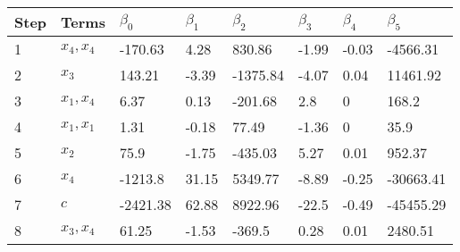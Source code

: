 \begin{tabular}{llllllll}
Step & Terms & $\beta_{0}$ & $\beta_{1}$ & $\beta_{2}$ & $\beta_{3}$ & $\beta_{4}$ & $\beta_{5}$ \\ 
\hline 
1 & $x_4,x_4$ & -170.63 & 4.28 & 830.86 & -1.99 & -0.03 & -4566.31 \\ 
2 & $x_3$ & 143.21 & -3.39 & -1375.84 & -4.07 & 0.04 & 11461.92 \\ 
3 & $x_1,x_4$ & 6.37 & 0.13 & -201.68 & 2.8 & 0 & 168.2 \\ 
4 & $x_1,x_1$ & 1.31 & -0.18 & 77.49 & -1.36 & 0 & 35.9 \\ 
5 & $x_2$ & 75.9 & -1.75 & -435.03 & 5.27 & 0.01 & 952.37 \\ 
6 & $x_4$ & -1213.8 & 31.15 & 5349.77 & -8.89 & -0.25 & -30663.41 \\ 
7 & $c$ & -2421.38 & 62.88 & 8922.96 & -22.5 & -0.49 & -45455.29 \\ 
8 & $x_3,x_4$ & 61.25 & -1.53 & -369.5 & 0.28 & 0.01 & 2480.51 \\ 
\hline 
\end{tabular}